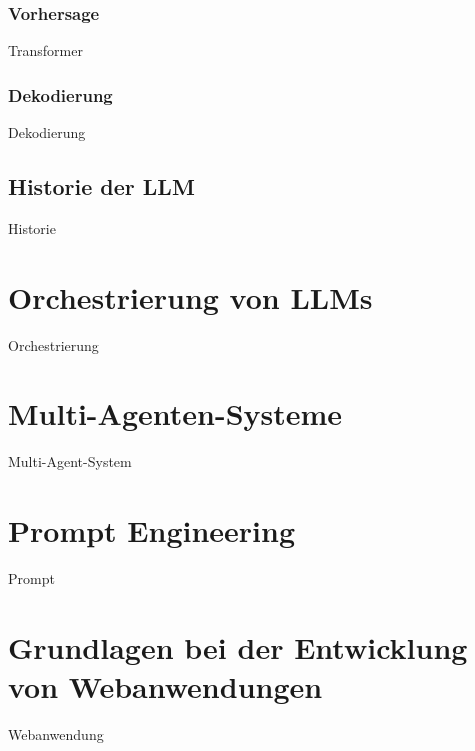 \subsubsection{Vorhersage}
Transformer

\subsubsection{Dekodierung}
Dekodierung

\subsection{Historie der LLM}
Historie



\section{Orchestrierung von LLMs}
Orchestrierung

\section{Multi-Agenten-Systeme}
Multi-Agent-System

\section{Prompt Engineering}
Prompt

\section{Grundlagen bei der Entwicklung von Webanwendungen}
Webanwendung
